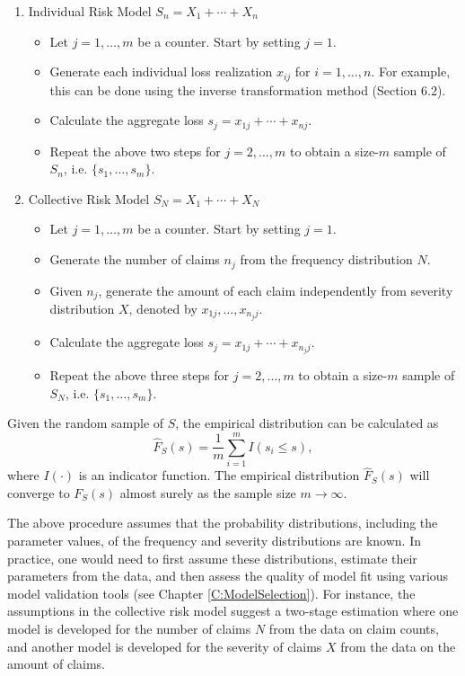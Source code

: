 \documentclass[]{book}
\providecommand{\tightlist}{%
  \setlength{\itemsep}{0pt}\setlength{\parskip}{0pt}}
\theoremstyle{definition}
\theoremstyle{definition}
\theoremstyle{definition}
\theoremstyle{remark}
\begin{document}
\begin{enumerate}
\def\labelenumi{\arabic{enumi}.}
\item
  Individual Risk Model \(S_n=X_1+\cdots+X_n\)

  \begin{itemize}
  \tightlist
  \item
    Let \(j=1,\ldots,m\) be a counter. Start by setting \(j=1\).
  \item
    Generate each individual loss realization \(x_{ij}\) for
    \(i=1,\ldots,n\). For example, this can be done using the inverse
    transformation method (Section 6.2).
  \item
    Calculate the aggregate loss \(s_j = x_{1j} + \cdots + x_{nj}\).
  \item
    Repeat the above two steps for \(j=2,\ldots,m\) to obtain a
    size-\(m\) sample of \(S_n\), i.e. \(\{s_1,\ldots,s_m\}\).
  \end{itemize}
\item
  Collective Risk Model \(S_N=X_1+\cdots+X_N\)

  \begin{itemize}
  \tightlist
  \item
    Let \(j=1, \ldots, m\) be a counter. Start by setting \(j=1\).
  \item
    Generate the number of claims \(n_j\) from the frequency
    distribution \(N\).
  \item
    Given \(n_j\), generate the amount of each claim independently from
    severity distribution \(X\), denoted by \(x_{1j},\ldots,x_{n_j j}\).
  \item
    Calculate the aggregate loss \(s_j = x_{1j} + \cdots + x_{n_j j}\).
  \item
    Repeat the above three steps for \(j=2,\ldots,m\) to obtain a
    size-\(m\) sample of \(S_N\), i.e. \(\{s_1,\ldots, s_m\}\).
  \end{itemize}
\end{enumerate}

Given the random sample of \(S\), the empirical distribution can be
calculated as \[\hat{F}_S(s)=\frac{1}{m}\sum_{i=1}^{m}I(s_i\leq s),\]
where \(I(\cdot)\) is an indicator function. The empirical distribution
\(\hat{F}_S(s)\) will converge to \({F}_S(s)\) almost surely as the
sample size \(m\rightarrow \infty\).

The above procedure assumes that the probability distributions,
including the parameter values, of the frequency and severity
distributions are known. In practice, one would need to first assume
these distributions, estimate their parameters from the data, and then
assess the quality of model fit using various model validation tools
(see Chapter \ref{C:ModelSelection}). For instance, the assumptions in
the collective risk model suggest a two-stage estimation where one model
is developed for the number of claims \(N\) from the data on claim
counts, and another model is developed for the severity of claims \(X\)
from the data on the amount of claims.
\end{document}
